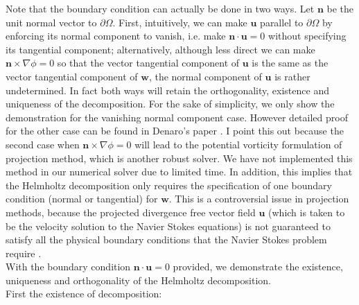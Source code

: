 Note that the boundary condition can actually be done in two ways. Let $\textbf{n}$ be the unit normal vector to $\partial \Omega$. First, intuitively, we can make $\textbf{u}$ parallel to $\partial \Omega$ by enforcing its normal component to vanish, i.e. make $\textbf{n} \cdot \textbf{u} = 0$ without specifying its tangential component; alternatively, although less direct we can make $\textbf{n} \times \nabla \phi = 0$ so that the vector tangential component of $\textbf{u}$ is the same as the vector tangential component of $\textbf{w}$, the normal component of $\textbf{u}$ is rather undetermined. In fact both ways will retain the orthogonality, existence and uniqueness of the decomposition. For the sake of simplicity, we only show the demonstration for the vanishing normal component case. However detailed proof for the other case can be found in Denaro's paper \cite{maria2003application}. I point this out because the second case when  $\textbf{n} \times \nabla \phi = 0$ will lead to the potential vorticity formulation of projection method, which is another robust solver. We have not implemented this method in our numerical solver due to limited time. In addition, this implies that the Helmholtz decomposition only requires the specification of one boundary condition (normal or tangential) for $\textbf{w}$. This is a controversial issue in projection methods, because the projected divergence free vector field $\textbf{u}$ (which is taken to be the velocity solution to the Navier Stokes equations) is not guaranteed to satisfy all the physical boundary conditions that the Navier Stokes problem require \cite{maria2003application}.\\

With the boundary condition $\textbf{n} \cdot \textbf{u} = 0$ provided, we demonstrate the existence, uniqueness and orthogonality of the Helmholtz decomposition.\\

First the existence of decomposition:\\

